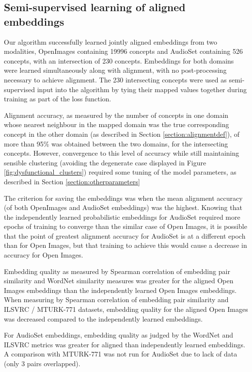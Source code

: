 \subsection{Semi-supervised learning of aligned embeddings}

Our algorithm successfully learned jointly aligned embeddings from two modalities, OpenImages containing 19996 concepts and AudioSet containing 526 concepts, with an intersection of 230 concepts. Embeddings for both domains were learned simultaneously along with alignment, with no post-processing necessary to achieve alignment. The 230 intersecting concepts were used as semi-supervised input into the algorithm by tying their mapped values together during training as part of the loss function. 

Alignment accuracy, as measured by the number of concepts in one domain whose nearest neighbour in the mapped domain was the true corresponding concept in the other domain (as described in Section \ref{section:alignmentdef}), of more than 95\% was obtained between the two domains, for the intersecting concepts. However, convergence to this level of accuracy while still maintaining sensible clustering (avoiding the degenerate case displayed in Figure \ref{fig:dysfunctional_clusters}) required some tuning of the model parameters, as described in Section \ref{section:otherparameters}
    
The criterion for saving the embeddings was when the mean alignment accuracy (of both OpenImages and AudioSet embeddings) was the highest. Knowing that the independently learned probabilistic embeddings for AudioSet required more epochs of training to converge than the similar case of Open Images, it is possible that the point of greatest alignment accuracy for AudioSet is at a different epoch than for Open Images, but that training to achieve this would cause a decrease in accuracy for Open Images. 

Embedding quality as measured by Spearman correlation of embedding pair similarity and WordNet similarity measures was greater for the aligned Open Images embeddings than the independently learned Open Images embeddings. When measuring by Spearman correlation of embedding pair similarity and ILSVRC / MTURK-771 datasets, embedding quality for the aligned Open Images was decreased compared to the independently learned embeddings.     

For AudioSet embeddings, embedding quality as judged by the WordNet and ILSVRC metrics was greater for aligned than independently learned embeddings. A comparison with MTURK-771 was not run for AudioSet due to lack of data (only 3 pairs overlapped).  

